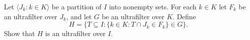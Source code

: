 Let $\langle J_k : k \in K \rangle$ be a partition of $I$ into nonempty sets. For each $k \in K$ let $F_k$ be an ultrafilter over $J_k$, and let $G$ be an ultrafilter over $K$. Define
$$H = \{T \subseteq I : \{k \in K : T \cap J_k \in F_k\} \in G\}.$$
Show that $H$ is an ultrafilter over $I$.
